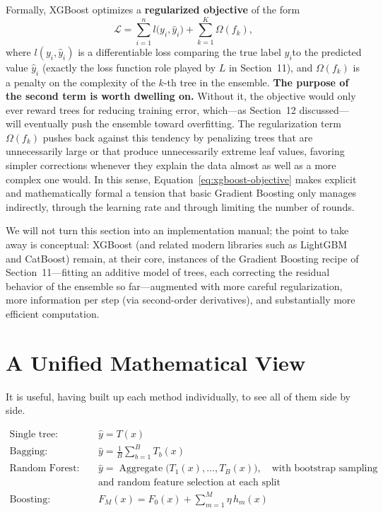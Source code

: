 \documentclass[12pt,a4paper]{article}
\begin{document}
Formally, XGBoost optimizes a \textbf{regularized objective} of the form
\begin{equation}
\label{eq:xgboost-objective}
\mathcal{L} = \sum_{i=1}^{n} l\big(y_i, \hat y_i\big) + \sum_{k=1}^{K} \Omega(f_k),
\end{equation}
where $l(y_i, \hat y_i)$ is a differentiable loss comparing the true label $y_i$to the predicted value $\hat y_i$ (exactly the loss function role played by $L$ in Section~11), and $\Omega(f_k)$ is a penalty on the complexity of the $k$-th tree in the ensemble. \textbf{The purpose of the second term is worth dwelling on.} Without it, the objective would only ever reward trees for reducing training error, which---as Section~12 discussed---will eventually push the ensemble toward overfitting. The regularization term $\Omega(f_k)$ pushes back against this tendency by penalizing trees that are unnecessarily large or that produce unnecessarily extreme leaf values, favoring simpler corrections whenever they explain the data almost as well as a more complex one would. In this sense, Equation~\eqref{eq:xgboost-objective} makes explicit and mathematically formal a tension that basic Gradient Boosting only manages indirectly, through the learning rate and through limiting the number of rounds.

We will not turn this section into an implementation manual; the point to take away is conceptual: XGBoost (and related modern libraries such as LightGBM and CatBoost) remain, at their core, instances of the Gradient Boosting recipe of Section~11---fitting an additive model of trees, each correcting the residual behavior of the ensemble so far---augmented with more careful regularization, more information per step (via second-order derivatives), and substantially more efficient computation.

\section{A Unified Mathematical View}

It is useful, having built up each method individually, to see all of them side by side.

\begin{align}
\text{Single tree:} \qquad & \hat y = T(x) \\
\text{Bagging:} \qquad & \hat y = \frac{1}{B}\sum_{b=1}^{B} T_b(x) \\
\text{Random Forest:} \qquad & \hat y = \operatorname{Aggregate}\big(T_1(x), \ldots, T_B(x)\big), \quad \text{with bootstrap sampling} \nonumber \\
& \text{and random feature selection at each split} \\
\text{Boosting:} \qquad & F_M(x) = F_0(x) + \sum_{m=1}^{M} \eta\, h_m(x)
\end{align}
\end{document}
